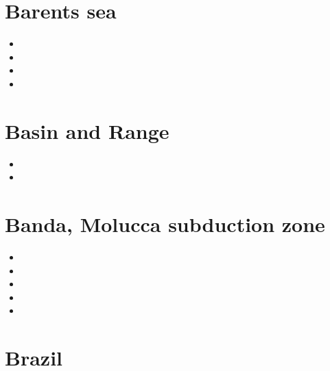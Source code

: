 \section{Barents sea}

\begin{small}
\begin{itemize}
\item[\twothousandseven]
\item[\twothousandthirteen]
\item[\twothousandfourteen]
\item[\twothousandfifteen]
\end{itemize}
\end{small}

\section{Basin and Range}

\begin{small}
\begin{itemize}
\item[\nineteeneightynine]
\item[\twothousandnine]
\end{itemize}
\end{small}

\section{Banda, Molucca subduction zone}

\begin{small}
\begin{itemize}
\item[\twothousandnine]
\item[\twothousandten]
\item[\twothousandtwentyone]
\item[\twothousandtwentytwo]
\item[\twothousandtwentyfour]
\end{itemize}
\end{small}


\section{Brazil}

